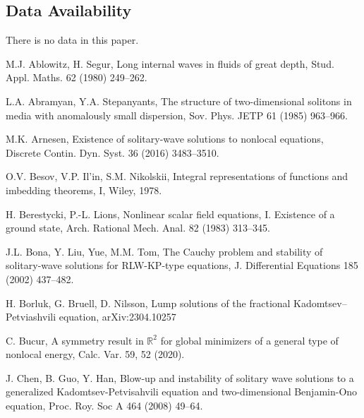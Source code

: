 \documentclass[10pt]{article}
\numberwithin{equation}{section}
\newcommand{\rt}{{\mathbb{R}^2}}
\begin{document}
		\subsection*{Data Availability}
		There is no data in this paper.
		\begin{thebibliography}{00}
			
			
			
			
			
			M.J. Ablowitz, H. Segur, 
			Long internal waves in 
			fluids of great depth, 
			Stud. Appl. Maths. 62 (1980) 249--262.
			
			 L.A. Abramyan, Y.A. Stepanyants, 
			The structure of two-dimensional solitons in media with anomalously small dispersion,
			Sov. Phys. JETP 61 (1985) 963--966.
			
			M.K. Arnesen,
			Existence of solitary-wave solutions to nonlocal equations,
			Discrete Contin. Dyn. Syst. 36 (2016) 3483--3510.
			
			{O.V. Besov, V.P. Il'in, S.M. Nikolskii},
			{Integral representations of functions and imbedding theorems}, I, Wiley, 1978.
			
H. Berestycki, P.-L. Lions, 
Nonlinear scalar field equations, I. Existence of a ground state, 
Arch. Rational Mech. Anal. 82 (1983)  313--345.			
			
			J.L. Bona, Y. Liu, Yue, M.M.  Tom,
			The Cauchy problem and stability of solitary-wave solutions for RLW-KP-type equations, J. Differential Equations 185 (2002) 437--482.
			
			
			H. Borluk, G. Bruell, D. Nilsson,
			Lump solutions of the fractional Kadomtsev–Petviashvili equation,
			arXiv:2304.10257
			
			
			
			C. Bucur, 
			A symmetry result in $\rt$ for global minimizers of a general type of nonlocal energy,
			Calc. Var. 59,  52 (2020).
			
			J. Chen, B. Guo, Y. Han, Blow-up and instability of solitary wave solutions to a
			generalized Kadomtsev-Petvisahvili equation and two-dimensional Benjamin-Ono equation,
			Proc. Roy. Soc A 464 (2008)  49--64.
			

\end{thebibliography}
\end{document}
